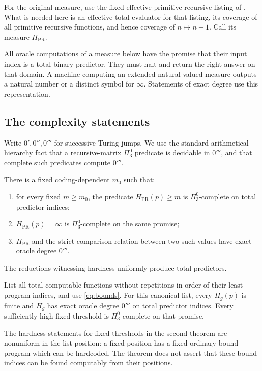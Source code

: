 \documentclass[11pt]{article}
\begin{document}
For the original measure, use the fixed effective primitive-recursive
listing of \cite[Definition~7]{AH}. What is needed here is an effective
total evaluator for that listing, its coverage of all primitive
recursive functions, and hence coverage of $n\mapsto n+1$.
Call its measure $H_{\mathrm{PR}}$.

All oracle computations of a measure below have the promise that
their input index is a total binary predictor. They must halt and
return the right answer on that domain. A machine computing an
extended-natural-valued measure outputs a natural number or a distinct
symbol for $\infty$. Statements of exact degree use this representation.

\subsection{The complexity statements}

Write $0',0'',0'''$ for successive Turing jumps. We use the standard
arithmetical-hierarchy fact that a recursive-matrix $\Pi^0_3$ predicate
is decidable in $0'''$, and that complete such predicates compute
$0'''$.

\begin{theorem}\label{thm:original}
There is a fixed coding-dependent $m_0$ such that:
\begin{enumerate}
\item for every fixed $m\ge m_0$, the predicate
      $H_{\mathrm{PR}}(p)\ge m$ is $\Pi^0_3$-complete on total
      predictor indices;
\item $H_{\mathrm{PR}}(p)=\infty$ is $\Pi^0_3$-complete on the same
      promise;
\item $H_{\mathrm{PR}}$ and the strict comparison relation between
      two such values have exact oracle degree $0'''$.
\end{enumerate}
The reductions witnessing hardness uniformly produce total predictors.
\end{theorem}

\begin{theorem}\label{thm:total}
List all total computable functions without repetitions in order of
their least program indices, and use \eqref{eq:bounds}. For this
canonical list, every $H_g(p)$ is finite and $H_g$ has exact oracle
degree $0'''$ on total predictor indices. Every sufficiently high
fixed threshold is $\Pi^0_3$-complete on that promise.
\end{theorem}

The hardness statements for fixed thresholds in the second theorem
are nonuniform in the list position: a fixed position has a fixed
ordinary bound program which can be hardcoded. The theorem does not
assert that these bound indices can be found computably from their
positions.
\end{document}
